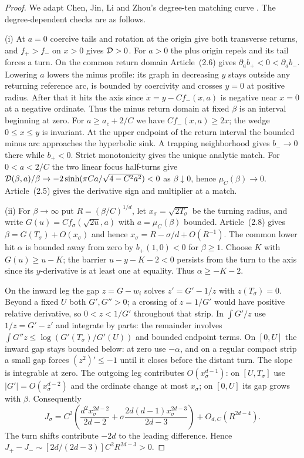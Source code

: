 \begin{proof}
We adapt Chen, Jin, Li and Zhou's degree-ten matching curve
\cite[Lemmas~3.1--3.2]{CJLZ}. The degree-dependent checks are as follows.

(i) At $a=0$ coercive tails and rotation at the origin give both
transverse returns, and $f_+>f_-$ on $x>0$ gives $\mathcal{D}>0$.
For $a>0$ the plus origin repels and its tail forces a turn.
On the common return domain Article~(2.6) gives
$\partial_a b_+<0<\partial_a b_-$. Lowering $a$ lowers the minus
profile: its graph in decreasing $y$ stays outside any returning
reference arc, is bounded by coercivity and crosses $y=0$ at positive
radius. After that it hits the axis since $\dot x=y-Cf_-(x,a)$
is negative near $x=0$ at a negative ordinate. Thus the minus return
domain at fixed $\beta$ is an interval beginning at zero.
For $a\ge a_c+2/C$ we have $Cf_-(x,a)\ge2x$; the wedge
$0\le x\le y$ is invariant. At the upper endpoint of the return
interval the bounded minus arc approaches the hyperbolic sink.
A trapping neighborhood gives $b_-\to0$ there while $b_+<0$.
Strict monotonicity gives the unique analytic match. For
$0<a<2/C$ the two linear focus half-turns give
$\mathcal{D}(\beta,a)/\beta\to-2\sinh(\pi Ca/\sqrt{4-C^2a^2})<0$
as $\beta\downarrow0$, hence $\mu_C(\beta)\to0$.
Article~(2.5) gives the derivative sign and multiplier at a match.

(ii) For $\beta\to\infty$ put $R=(\beta/C)^{1/d}$, let
$x_\sigma=\sqrt{2T_\sigma}$ be the turning radius, and write
$G(u)=Cf_\sigma(\sqrt{2u},a)$ with $a=\mu_C(\beta)$ bounded.
Article~(2.8) gives $\beta=G(T_\sigma)+O(x_\sigma)$ and hence
$x_\sigma=R-\sigma/d+O(R^{-1})$. The common lower hit $\alpha$
is bounded away from zero by $b_+(1,0)<0$ for $\beta\ge1$.
Choose $K$ with $G(u)\ge u-K$; the barrier $u-y-K-2<0$
persists from the turn to the axis since its $y$-derivative is at
least one at equality. Thus $\alpha\ge-K-2$.

On the inward leg the gap $z=G-w_i$ solves $z'=G'-1/z$ with
$z(T_\sigma)=0$. Beyond a fixed $U$ both $G',G''>0$; a crossing
of $z=1/G'$ would have positive relative derivative, so $0<z<1/G'$
throughout that strip. In $\int G'/z$ use $1/z=G'-z'$ and integrate
by parts: the remainder involves $\int G''z\le\log(G'(T_\sigma)/G'(U))$
and bounded endpoint terms. On $[0,U]$ the inward gap stays bounded
below: at zero use $-\alpha$, and on a regular compact strip a small
gap forces $(z^2)'\le-1$ until it closes before the distant turn.
The slope is integrable at zero. The outgoing leg contributes
$O(x_\sigma^{d-1})$: on $[U,T_\sigma]$ use
$|G'|=O(x_\sigma^{d-2})$ and the ordinate change at most
$x_\sigma$; on $[0,U]$ its gap grows with $\beta$.
Consequently
\[
 J_\sigma=C^2\left(\frac{d^2 x_\sigma^{2d-2}}{2d-2}
 +\sigma\frac{2d(d-1)x_\sigma^{2d-3}}{2d-3}\right)+O_{d,C}(R^{2d-4}).
\]
The turn shifts contribute $-2d$ to the leading difference. Hence
$J_+-J_-\sim [2d/(2d-3)]C^2R^{2d-3}>0$.


\end{proof}

